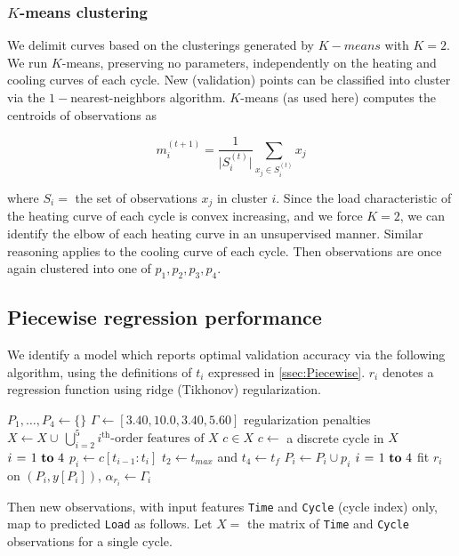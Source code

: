 \documentclass[letterpaper, 10 pt, conference]{ieeeconf}  %
\begin{document}
\subsubsection{$K$-means clustering}
We delimit curves based on the clusterings generated by $K-means$ with $K=2$.  We run $K$-means, preserving no parameters, independently on the heating and cooling curves of each cycle. New (validation) points can be classified into cluster via the $1-$nearest-neighbors algorithm. $K$-means (as used here) computes the centroids of observations as

$$
m_i^{(t+1)} = \frac{1}{\vert S_i^{(t)} \vert} \sum_{x_j \in S_i^{(t)}} x_j
$$

where $S_i =$ the set of observations $x_j$ in cluster $i$. Since the load characteristic of the heating curve of each cycle is convex increasing, and we force $K=2$, we can identify the elbow of each heating curve in an unsupervised manner. Similar reasoning applies to the cooling curve of each cycle. Then observations are once again clustered into one of $p_1, p_2, p_3, p_4$.

\subsection{Piecewise regression performance}
We identify a model which reports optimal validation accuracy via the following algorithm, using the definitions of $t_i$ expressed in \ref{ssec:Piecewise}. $r_i$ denotes a regression function using ridge (Tikhonov) regularization.
\begin{codebox}
  \li $P_1, \dots , P_4 \gets \{\}$
  \li $\Gamma \gets [3.40, 10.0, 3.40, 5.60]$ \hspace{3pt} \Comment regularization penalties
  \li $X \gets X \cup \, \bigcup_{i=2}^5 i^{\text{th}}\text{-order features of }X$
  \li \For $c \in X$ \hspace{60pt} \Comment $c \gets $ a discrete cycle in $X$ \Do
    \li \For $i \gets 1 \To 4$ \Do
      \li $p_i \gets c[t_{i-1}:t_i]$ \Comment $t_2 \gets t_{max}$ and $t_4 \gets t_f$
      \li $P_i \gets P_i \cup p_i$
    \End
  \End
  \li \For $i \gets 1 \To 4$ \Do
    \li fit $r_i$ on $(P_i, y[P_i])$, $\alpha_{r_i} \gets \Gamma_i$
  \End
\end{codebox}

Then new observations, with input features \verb|Time| and \verb|Cycle| (cycle index) only, map to predicted \verb|Load| as follows. Let $X=$ the matrix of \verb|Time| and \verb|Cycle| observations for a single cycle.
\end{document}
